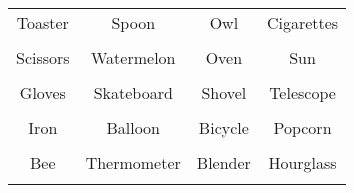 \documentclass[12pt,a4paper]{article}
\begin{document}
\thispagestyle{empty}
\begin{table}[]
\centering
\Huge
\begin{tabular}{cccc}
 Toaster& Spoon& Owl& Cigarettes\\  & & & \\
 Scissors& Watermelon& Oven& Sun\\  & & & \\
 Gloves& Skateboard& Shovel& Telescope\\  & & & \\
 Iron& Balloon& Bicycle& Popcorn\\  & & & \\
 Bee& Thermometer& Blender& Hourglass\\  & & & \\
\end{tabular}
\end{table}
\end{document}
